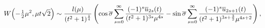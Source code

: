 \[\mathop{W\/}\nolimits\!\left(-\tfrac{1}{2}\mu^{2},\mu t\sqrt{2}\right)\sim%
\frac{l(\mu)}{(t^{2}+1)^{\frac{1}{4}}}\left(\mathop{\cos\/}\nolimits\overline{%
\sigma}\sum_{s=0}^{\infty}\frac{(-1)^{s}\overline{u}_{2s}(t)}{(t^{2}+1)^{3s}%
\mu^{4s}}-\mathop{\sin\/}\nolimits\overline{\sigma}\sum_{s=0}^{\infty}\frac{(-%
1)^{s}\overline{u}_{2s+1}(t)}{(t^{2}+1)^{3s+\frac{3}{2}}\mu^{4s+2}}\right),\]